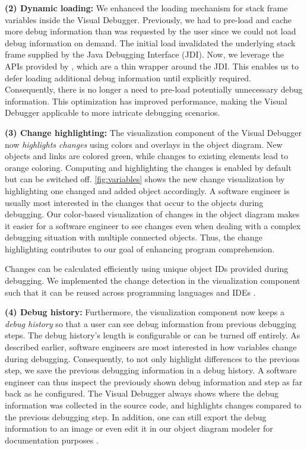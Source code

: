 \documentclass[sigconf]{acmart}
\begin{document}
\textbf{(2) Dynamic loading:} We enhanced the loading mechanism for stack frame variables inside the Visual Debugger.
Previously, we had to pre-load and cache more debug information than was requested by the user since we could not load debug information on demand.
The initial load invalidated the underlying stack frame supplied by the Java Debugging Interface (JDI).
Now, we leverage the APIs provided by \intellij{}, which are a thin wrapper around the JDI.
This enables us to defer loading additional debug information until explicitly required.
Consequently, there is no longer a need to pre-load potentially unnecessary debug information.
This optimization has improved performance, making the Visual Debugger applicable to more intricate debugging scenarios.

\textbf{(3) Change highlighting:} The visualization component of the Visual Debugger now \textit{highlights changes} using colors and overlays in the object diagram.
New objects and links are colored green, while changes to existing elements lead to orange coloring.
Computing and highlighting the changes is enabled by default but can be switched off.
\autoref{fig:variables} shows the new change visualization by highlighting one changed and added object accordingly.
A software engineer is usually most interested in the changes that occur to the objects during debugging.
Our color-based visualization of changes in the object diagram makes it easier for a software engineer to see changes even when dealing with a complex debugging situation with multiple connected objects.
Thus, the change highlighting contributes to our goal of enhancing program comprehension.

Changes can be calculated efficiently using unique object IDs provided during debugging.
We implemented the change detection in the visualization component such that it can be reused across programming languages and IDEs \cite{timkrauterICSE2024Artifacts2024}.

\textbf{(4) Debug history:} Furthermore, the visualization component now keeps a \textit{debug history} so that a user can see debug information from previous debugging steps.
The debug history's length is configurable or can be turned off entirely.
As described earlier, software engineers are most interested in how variables change during debugging.
Consequently, to not only highlight differences to the previous step, we save the previous debugging information in a debug history.
A software engineer can thus inspect the previously shown debug information and step as far back as he configured.
The Visual Debugger always shows where the debug information was collected in the source code, and highlights changes compared to the previous debugging step.
In addition, one can still export the debug information to an image or even edit it in our object diagram modeler \cite{timkrauterObjectdiagramjs2023} for documentation purposes \cite{krauterVisualDebuggerTool2022}.
\end{document}
